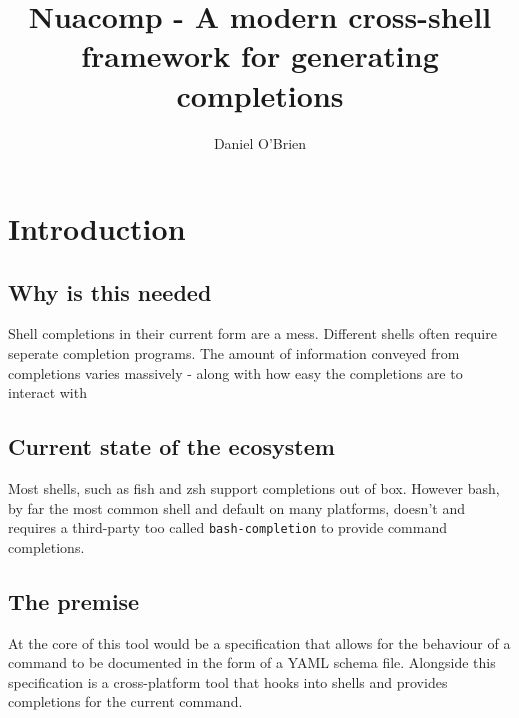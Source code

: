\documentclass[a4paper,10pt]{report}
\title{Nuacomp - A modern cross-shell framework for generating completions}
\author{Daniel O'Brien}
\begin{document}
\maketitle

\begin{abstract}
\end{abstract}

\chapter{Introduction}

\section{Why is this needed}

Shell completions in their current form are a mess. Different shells often require seperate completion programs. The amount of information conveyed from completions varies massively - along with how easy the completions are to interact with

\section{Current state of the ecosystem}

Most shells, such as fish and zsh support completions out of box. However bash, by far the most common shell and default on many platforms, doesn't and requires a third-party too called \texttt{bash-completion} to provide command completions.

\section{The premise}

At the core of this tool would be a specification that allows for the behaviour of a command to be documented in the form of a YAML schema file. Alongside this specification is a cross-platform tool that hooks into shells and provides completions for the current command.
\end{document}
